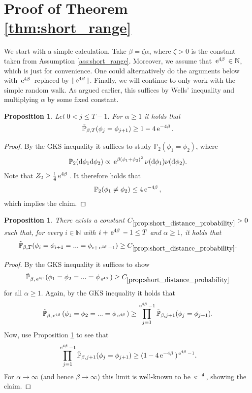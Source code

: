\documentclass[reqno,11pt]{amsart}
\newcommand{\1}{\mathds{1}}
\theoremstyle{plain}
\newtheorem{proposition}[theorem]{Proposition}
\theoremstyle{definition}
\numberwithin{equation}{section}
\newcommand{\e}[1]{\,{\rm e}^{#1}\,}
\newcommand{\bbN}{{\mathbb N}}
\newcommand{\bbP}{{\mathbb P}}
\newcommand{\de}{{\mathrm{d}}}
\newcommand{\bbPw}{\Tilde{\bbP}}
\begin{document}
\section{Proof of Theorem \ref{thm:short_range}}
We start with a simple calculation. Take $\beta = \zeta \alpha$, where $\zeta > 0$ is the constant taken from Assumption \ref{ass:short_range}.
Moreover, 
we assume that $\e{4\beta} \in \bbN$, which is just for convenience. One could alternatively do the arguments  below with $\e{4\beta}$ replaced by $ \lfloor \e{4\beta} \rfloor$. Finally, we will continue to only work with the simple random walk. As argued earlier, this suffices by Wells' inequality and multiplying $\alpha$ by some fixed constant.
\begin{proposition}
    \label{prop:short_range_prob_exponential_decay}
    Let $0 < j \le T-1$. For $\alpha \ge 1$ it holds that 
    $$\bbPw_{\beta,T} ( \phi_j = \phi_{j+1}) \ge 1- 4\e{-4\beta}.$$
\end{proposition}
\begin{proof}
    By the GKS inequality it suffices to study $\bbP_{2} (\phi_1 = \phi_{2})$, where
    $$\bbP_2 (\de \phi_1 \de \phi_2) \propto \e{ \beta (\phi_1 + \phi_2)^2} \nu(\de \phi_1)\nu(\de \phi_2).$$
    Note that $Z_{2} \ge \frac 1 4 \e{4 \beta}$.
    It therefore holds that
    $$\bbP_2 (\phi_1 \neq \phi_2) \le 4\e{-4\beta},$$
    which implies the claim.
\end{proof}

\begin{proposition}
    \label{prop:short_distance_probability}
    There exists a constant $C_{\ref{prop:short_distance_probability}} >0$ such that, for every $i \in \bbN$ with $i + \e{4\beta}-1 \le T$ and $\alpha \ge 1$, it holds that
    $$\bbPw_{\beta,T}(\phi_i = \phi_{i+1} = ...= \phi_{i+ \e{4\beta}-1}) \ge C_{\ref{prop:short_distance_probability}}.$$
\end{proposition}

\begin{proof}
    By the GKS inequality it suffices to show
    $$\bbPw_{\beta,\e{4\beta}}(\phi_1 = \phi_{2} =...= \phi_{\e{4\beta}}) \ge C_{\ref{prop:short_distance_probability}}$$
    for all $\alpha \ge 1$. Again, by the GKS inequality it holds that
    $$\bbPw_{\beta,\e{4\beta}}(\phi_1 = \phi_{2} =...=\phi_{\e{4\beta}}) \ge \prod\limits_{j=1} ^{\e{4\beta}-1} \bbPw_{\beta,j+1} ( \phi_j = \phi_{j+1}).$$
    Now, use Proposition \ref{prop:short_range_prob_exponential_decay} to see that
    $$\prod\limits_{j=1} ^{\e{4\beta}-1} \bbPw_{\beta,j+1} ( \phi_j = \phi_{j+1}) \ge (1-4\e{-4\beta})^{\e{4\beta}-1}.$$
    For $\alpha \to \infty$ (and hence $\beta \to \infty$) this limit is well-known to be $\e{-4}$, showing the claim.
\end{proof}
\end{document}
